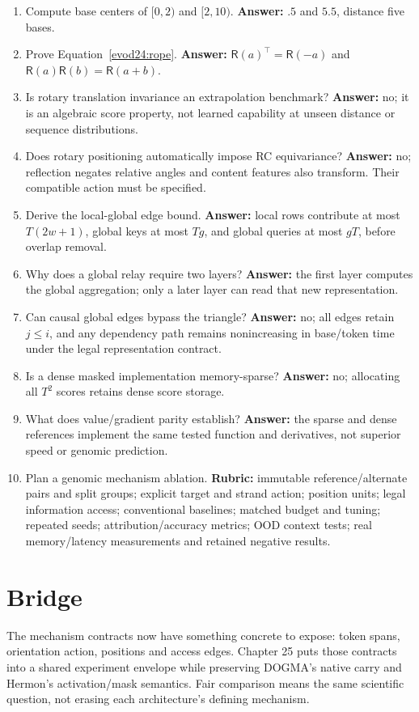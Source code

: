 \begin{enumerate}
\textbf{Answer:} when the target changes under RC, such as an orientation-specific
label; invariance can erase the required distinction.
\item Compute base centers of $[0,2)$ and $[2,10)$.
\textbf{Answer:} $.5$ and $5.5$, distance five bases.
\item Prove Equation~\ref{evod24:rope}.
\textbf{Answer:} $\mathsf R(a)^\top=\mathsf R(-a)$ and
$\mathsf R(a)\mathsf R(b)=\mathsf R(a+b)$.
\item Is rotary translation invariance an extrapolation benchmark?
\textbf{Answer:} no; it is an algebraic score property, not learned capability at
unseen distance or sequence distributions.
\item Does rotary positioning automatically impose RC equivariance?
\textbf{Answer:} no; reflection negates relative angles and content features also
transform. Their compatible action must be specified.
\item Derive the local-global edge bound.
\textbf{Answer:} local rows contribute at most $T(2w+1)$, global keys at most
$Tg$, and global queries at most $gT$, before overlap removal.
\item Why does a global relay require two layers?
\textbf{Answer:} the first layer computes the global aggregation; only a later
layer can read that new representation.
\item Can causal global edges bypass the triangle?
\textbf{Answer:} no; all edges retain $j\le i$, and any dependency path remains
nonincreasing in base/token time under the legal representation contract.
\item Is a dense masked implementation memory-sparse?
\textbf{Answer:} no; allocating all $T^2$ scores retains dense score storage.
\item What does value/gradient parity establish?
\textbf{Answer:} the sparse and dense references implement the same tested
function and derivatives, not superior speed or genomic prediction.
\item Plan a genomic mechanism ablation.
\textbf{Rubric:} immutable reference/alternate pairs and split groups; explicit
target and strand action; position units; legal information access; conventional
baselines; matched budget and tuning; repeated seeds; attribution/accuracy metrics;
OOD context tests; real memory/latency measurements and retained negative results.
\end{enumerate}

\section{Bridge}
The mechanism contracts now have something concrete to expose: token spans,
orientation action, positions and access edges. Chapter 25 puts those contracts
into a shared experiment envelope while preserving DOGMA's native carry and
Hermon's activation/mask semantics. Fair comparison means the same scientific
question, not erasing each architecture's defining mechanism.
